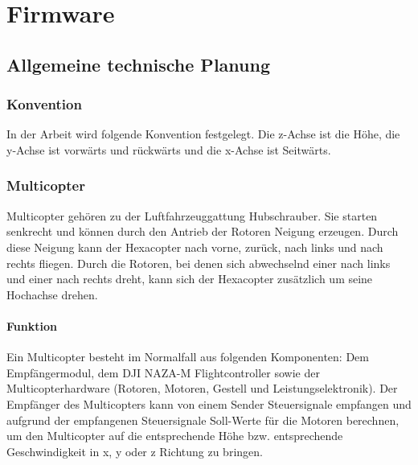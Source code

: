 \chapter{Firmware}
\renewcommand{\kapitelautor}{Autor: Christina Bornberg, Lucas Ullrich}

\section{Allgemeine technische Planung}

  \subsection{Konvention}
  In der Arbeit wird folgende Konvention festgelegt. Die z-Achse ist die Höhe, die y-Achse ist vorwärts und rückwärts und die x-Achse ist Seitwärts.


  \subsection{Multicopter}
  Multicopter gehören zu der Luftfahrzeuggattung Hubschrauber. Sie starten senkrecht und können durch den Antrieb der Rotoren Neigung erzeugen. Durch diese Neigung kann der Hexacopter nach vorne, zurück, nach links und nach rechts fliegen. Durch die Rotoren, bei denen sich abwechselnd einer nach links und einer nach rechts dreht, kann sich der Hexacopter zusätzlich um seine Hochachse drehen.

  \subsubsection{Funktion}
  Ein Multicopter besteht im Normalfall aus folgenden Komponenten:
  Dem Empfängermodul, dem DJI NAZA-M Flightcontroller sowie der Multicopterhardware (Rotoren, Motoren, Gestell und Leistungselektronik). Der Empfänger des Multicopters kann von einem Sender Steuersignale empfangen und aufgrund der empfangenen Steuersignale Soll-Werte für die Motoren berechnen, um den Multicopter auf die entsprechende Höhe bzw. entsprechende Geschwindigkeit in x, y oder z Richtung zu bringen.


